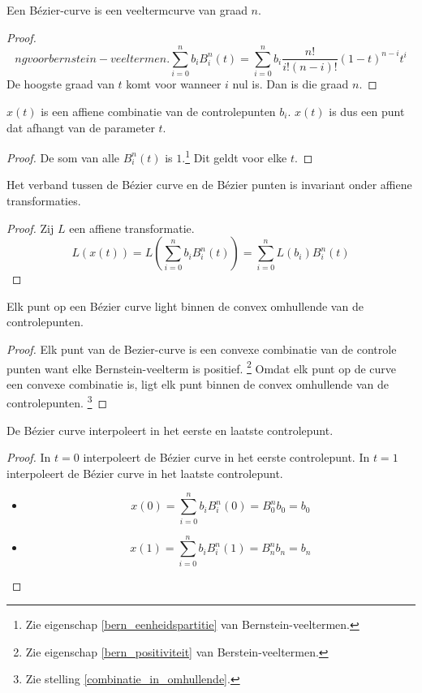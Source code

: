 \documentclass[computergesteund_ontwerp_van_curven_en_oppervlakken.tex]{subfiles}
\begin{document}
\begin{ei}
\label{bezier_veelterm}
Een B\'ezier-curve is een veeltermcurve van graad $n$.
\begin{proof}
\[ng voor bernstein-veeltermen.
\sum_{i=0}^nb_{i}B_{i}^{n}(t) = \sum_{i=0}^nb_i\frac{n!}{i!(n-i)!}(1-t)^{n-i}t^{i}
\]
De hoogste graad van $t$ komt voor wanneer $i$ nul is. Dan is die graad $n$.
\end{proof}
\end{ei}

\begin{ei}
$x(t)$ is een affiene combinatie van de controlepunten $b_i$. $x(t)$ is dus een punt dat afhangt van de parameter $t$.
\begin{proof}
De som van alle $B_{i}^{n}(t)$ is $1$.\footnote{Zie eigenschap \ref{bern_eenheidspartitie} van Bernstein-veeltermen.} Dit geldt voor elke $t$.
\end{proof}
\end{ei}

\begin{ei}
Het verband tussen de B\'ezier curve en de B\'ezier punten is invariant onder affiene transformaties.
\begin{proof}
Zij $L$ een affiene transformatie.
\[
L(x(t))
= L\left( \sum_{i=0}^nb_{i}B_{i}^{n}(t)\right)
= \sum_{i=0}^nL(b_{i})B_{i}^{n}(t)
\]
\end{proof}
\end{ei}

\begin{ei}
Elk punt op een B\'ezier curve light binnen de convex omhullende van de controlepunten.
\begin{proof}
Elk punt van de Bezier-curve is een convexe combinatie van de controle punten want elke Bernstein-veelterm is positief. \footnote{Zie eigenschap \ref{bern_positiviteit} van Berstein-veeltermen.} Omdat elk punt op de curve een convexe combinatie is, ligt elk punt binnen de convex omhullende van de controlepunten. \footnote{Zie stelling \ref{combinatie_in_omhullende}.}
\end{proof}
\end{ei}

\begin{ei}
De B\'ezier curve interpoleert in het eerste en laatste controlepunt.
\begin{proof}
In $t=0$ interpoleert de B\'ezier curve in het eerste controlepunt. In $t=1$ interpoleert de B\'ezier curve in het laatste controlepunt.
\begin{itemize}
\item
\[
x(0) = \sum_{i=0}^nb_{i}B_{i}^{n}(0) = B_{0}^nb_0 = b_0
\]

\item
\[
x(1) = \sum_{i=0}^nb_{i}B_{i}^{n}(1) = B_{n}^nb_n = b_n
\]
\end{itemize}
\end{proof}
\end{ei}
\end{document}
